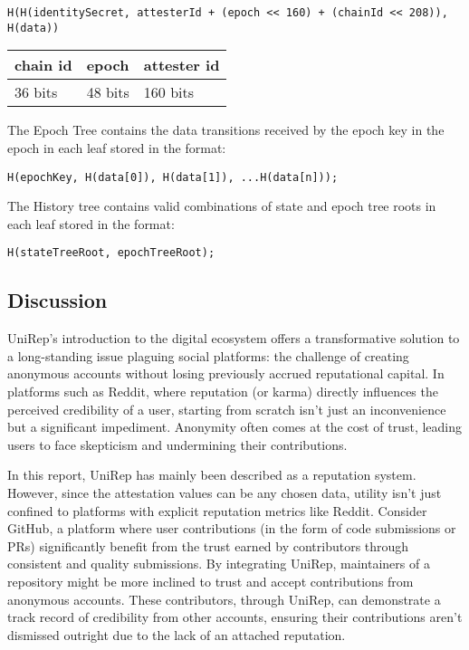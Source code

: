 \documentclass[11pt]{article}
\begin{document}
\begin{verbatim}
H(H(identitySecret, attesterId + (epoch << 160) + (chainId << 208)), H(data))
\end{verbatim}

\begin{center}
\begin{tabular}{lll}
chain id & epoch & attester id\\[0pt]
\hline
36 bits & 48 bits & 160 bits\\[0pt]
\end{tabular}
\end{center}

The Epoch Tree contains the data transitions received by the epoch key in the epoch in each leaf stored in the format:

\begin{verbatim}
H(epochKey, H(data[0]), H(data[1]), ...H(data[n]));
\end{verbatim}

The History tree contains valid combinations of state and epoch tree roots in each leaf stored in the format:

\begin{verbatim}
H(stateTreeRoot, epochTreeRoot);
\end{verbatim}
\subsection{Discussion}
\label{sec:org12d80e5}

UniRep's introduction to the digital ecosystem offers a transformative solution to a long-standing issue plaguing social platforms: the challenge of creating anonymous accounts without losing previously accrued reputational capital. In platforms such as Reddit, where reputation (or karma) directly influences the perceived credibility of a user, starting from scratch isn't just an inconvenience but a significant impediment. Anonymity often comes at the cost of trust, leading users to face skepticism and undermining their contributions.

In this report, UniRep has mainly been described as a reputation system. However, since the attestation values can be any chosen data, utility isn't just confined to platforms with explicit reputation metrics like Reddit. Consider GitHub, a platform where user contributions (in the form of code submissions or PRs) significantly benefit from the trust earned by contributors through consistent and quality submissions. By integrating UniRep, maintainers of a repository might be more inclined to trust and accept contributions from anonymous accounts. These contributors, through UniRep, can demonstrate a track record of credibility from other accounts, ensuring their contributions aren't dismissed outright due to the lack of an attached reputation.
\end{document}
